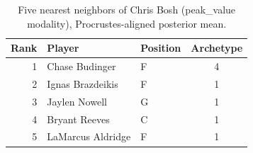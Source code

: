\begin{table}[htbp]
  \centering\small
  \begin{tabular}{rllc}
    \toprule
    Rank & Player & Position & Archetype \\
    \midrule
    1 & Chase Budinger & F & 4 \\
    2 & Ignas Brazdeikis & F & 1 \\
    3 & Jaylen Nowell & G & 1 \\
    4 & Bryant Reeves & C & 1 \\
    5 & LaMarcus Aldridge & F & 1 \\
    \bottomrule
  \end{tabular}
  \caption{Five nearest neighbors of Chris Bosh (peak_value modality), Procrustes-aligned posterior mean.}
  \label{tab:Chris_Bosh_neighbors_peak_value}
\end{table}

